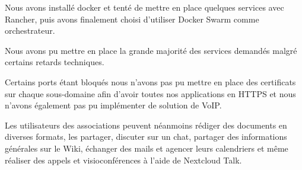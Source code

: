 Nous avons installé docker et tenté de mettre en place quelques services avec Rancher, puis avons finalement choisi d'utiliser Docker Swarm comme orchestrateur.

Nous avons pu mettre en place la grande majorité des services demandés malgré certains retards techniques. 

Certains ports étant bloqués nous n'avons pas pu mettre en place des certificats sur chaque sous-domaine afin d'avoir toutes nos applications en HTTPS et nous n'avons également pas pu implémenter de solution de VoIP.

Les utilisateurs des associations peuvent néanmoins rédiger des documents en diverses formats, les partager, discuter sur un chat, partager des informations générales sur le Wiki, échanger des mails et agencer leurs calendriers et même réaliser des appels et visioconférences à l'aide de Nextcloud Talk.


